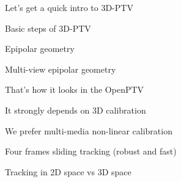\begin{frame}[label=ptv-4]{Let's get a quick intro to 3D-PTV}
    \centering {}
\end{frame}


\begin{frame}[label=ptv-5]{Basic steps of 3D-PTV}
    \centering{}
\end{frame}


\begin{frame}[label=ptv-6]{Epipolar geometry}
    \centering{}
\end{frame}

\begin{frame}[label=ptv-7]{Multi-view epipolar geometry}
    \centering{}
\end{frame}

\begin{frame}[label=ptv-8]{That's how it looks in the OpenPTV}
    \centering{}
\end{frame}

\begin{frame}[label=ptv-9a]{It strongly depends on 3D calibration}
    \centering{}
\end{frame}


\begin{frame}[label=ptv-9b]{We prefer multi-media non-linear calibration}
    \centering{}
\end{frame}

\begin{frame}[label=ptv-10]{Four frames sliding tracking (robust and fast)}
    \centering{}
\end{frame}

\begin{frame}[label=ptv-11]{Tracking in 2D space vs 3D space}
    \centering{}
\end{frame}


